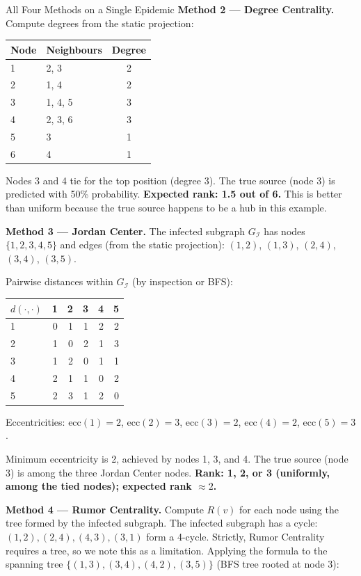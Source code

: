 \begin{examplebox}{All Four Methods on a Single Epidemic}
\medskip
\textbf{Method 2 — Degree Centrality.}
Compute degrees from the static projection:
\begin{center}
\small
\begin{tabular}{llc}
\toprule
Node & Neighbours & Degree \\
\midrule
1 & 2, 3     & 2 \\
2 & 1, 4     & 2 \\
3 & 1, 4, 5  & 3 \\
4 & 2, 3, 6  & 3 \\
5 & 3        & 1 \\
6 & 4        & 1 \\
\bottomrule
\end{tabular}
\end{center}

Nodes 3 and 4 tie for the top position (degree 3). The true source (node 3) is
predicted with 50\% probability. \textbf{Expected rank: 1.5 out of 6.} This is better
than uniform because the true source happens to be a hub in this example.

\medskip
\textbf{Method 3 — Jordan Center.}
The infected subgraph $G_\mathcal{I}$ has nodes $\{1, 2, 3, 4, 5\}$ and edges
(from the static projection): $(1,2)$, $(1,3)$, $(2,4)$, $(3,4)$, $(3,5)$.

Pairwise distances within $G_\mathcal{I}$ (by inspection or BFS):
\begin{center}
\small
\begin{tabular}{lrrrrr}
\toprule
$d(\cdot,\cdot)$ & 1 & 2 & 3 & 4 & 5 \\
\midrule
1 & 0 & 1 & 1 & 2 & 2 \\
2 & 1 & 0 & 2 & 1 & 3 \\
3 & 1 & 2 & 0 & 1 & 1 \\
4 & 2 & 1 & 1 & 0 & 2 \\
5 & 2 & 3 & 1 & 2 & 0 \\
\bottomrule
\end{tabular}
\end{center}

Eccentricities: $\text{ecc}(1) = 2$, $\text{ecc}(2) = 3$, $\text{ecc}(3) = 2$,
$\text{ecc}(4) = 2$, $\text{ecc}(5) = 3$.

Minimum eccentricity is 2, achieved by nodes 1, 3, and 4. The true source (node 3) is
among the three Jordan Center nodes. \textbf{Rank: 1, 2, or 3 (uniformly, among the
tied nodes); expected rank $\approx 2$. }

\medskip
\textbf{Method 4 — Rumor Centrality.}
Compute $R(v)$ for each node using the tree formed by the infected subgraph. The
infected subgraph has a cycle: $(1,2), (2,4), (4,3), (3,1)$ form a 4-cycle. Strictly,
Rumor Centrality requires a tree, so we note this as a limitation. Applying the formula
to the spanning tree $\{(1,3), (3,4), (4,2), (3,5)\}$ (BFS tree rooted at node 3):


\end{examplebox}
